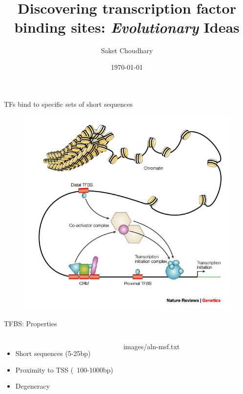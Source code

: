 \documentclass[10pt]{beamer}
\title{Discovering transcription factor binding sites: \textit{Evolutionary} Ideas}
\subtitle{}
\date{\today}
\author{Saket Choudhary}
\begin{document}
\maketitle


{
\begin{frame}[fragile]{TFs bind to specific sets of short sequences}
  \begin{figure}
	  \includegraphics[width=0.8\linewidth]{images/crm.jpg}
  \end{figure}
\end{frame}
}

\begin{frame}[fragile]{TFBS: Properties}
  \begin{columns}[T,onlytextwidth]
    \begin{itemize}[<+- | alert@+>]
    	\item Short sequences (5-25bp)
  	  	\item Proximity to TSS (~100-1000bp)
   		\item Degeneracy
    \end{itemize}
	\begin{texshade}{images/aln-msf.txt}
      \hidenumbering
	\end{texshade}
  \end{columns}
\end{frame}
\end{document}
